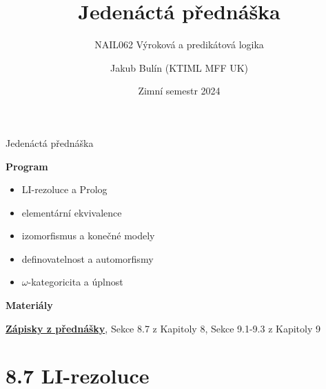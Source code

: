 \documentclass{beamer}
\title{Jedenáctá přednáška}
\subtitle{NAIL062 Výroková a predikátová logika}
\author{Jakub Bulín (KTIML MFF UK)}
\date{Zimní semestr 2024}
\begin{document}
\maketitle


\begin{frame}{Jedenáctá přednáška}

    \textbf{Program}
        \begin{itemize}            
            \item LI-rezoluce a Prolog
            \item elementární ekvivalence
            \item izomorfismus a konečné modely
            \item definovatelnost a automorfismy
            \item $\omega$-kategoricita a úplnost
        \end{itemize}

    \textbf{Materiály}

        \href{https://github.com/jbulin-mff-uk/nail062/raw/main/lecture/lecture-notes/lecture-notes.pdf}{\alert{\textbf{Zápisky z přednášky}}}, Sekce 8.7 z Kapitoly 8, Sekce 9.1-9.3 z Kapitoly 9

\end{frame}


\section{8.7 LI-rezoluce}
\end{document}
